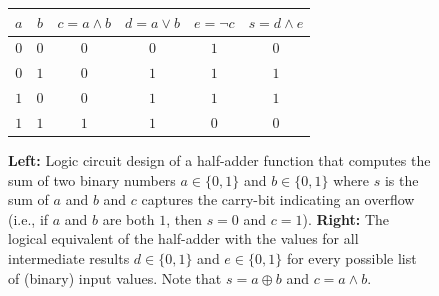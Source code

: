 \begin{figure}
\begin{minipage}[c]{.45\linewidth}
    \end{minipage} \hfill
    \begin{minipage}[c]{.5\linewidth}
        \centering
        \begin{tabular}{c|c||c|c|c|c}
            $a$ & $b$ & $c = a \land b$ & $d = a \lor b$ & $e = \neg c$ & $s = d \land e$ \\
            \hline
            $0$ & $0$ & $0$             & $0$            & $1$          & $0$             \\
            $0$ & $1$ & $0$             & $1$            & $1$          & $1$             \\
            $1$ & $0$ & $0$             & $1$            & $1$          & $1$             \\
            $1$ & $1$ & $1$             & $1$            & $0$          & $0$             \\
        \end{tabular}
    \end{minipage}
    \caption{{\bf Left:} Logic circuit design of a half-adder function that computes the sum of two binary numbers $a \in \{0,1\}$ and $b \in \{0,1\}$ where $s$ is the sum of $a$ and $b$ and $c$ captures the carry-bit indicating an overflow (i.e., if $a$ and $b$ are both $1$, then $s=0$ and $c=1$). {\bf Right:} The logical equivalent of the half-adder with the values for all intermediate results $d \in \{0,1\}$ and $e \in \{0,1\}$ for every possible list of (binary) input values. Note that $s = a \oplus b$ and $c = a \land b$. \label{fig:half-adder}}
\end{figure}

